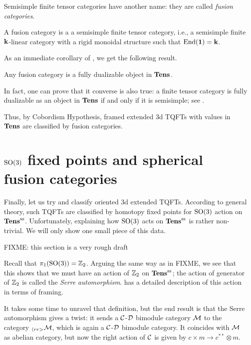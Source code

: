 Semisimple finite tensor categories have another name: they are called
\emph{fusion categories}.


\begin{definition}\label{d:fusion}
  A fusion category is a a semisimple finite tensor category, i.e., a semisimple
  finite $\mathbf{k}$-linear category with a rigid monoidal structure such that
  $\operatorname{End}(\mathbf{1})=\mathbf{k}$.
\end{definition}

As an immediate corollary of , we get the
following result.
\begin{corollary}\label{c:fusion-fd}
  Any fusion category is a fully dualizable object in $\mathbf{Tens}$.
\end{corollary}

In fact, one can prove that it converse is also true: a finite tensor
category is fully dualizable as an object in $\mathbf{Tens}$ if and only if it is
semisimple; see \cite[Proposition 3.4.10]{dsps-dualizable}.

Thus, by Cobordism Hypothesis, framed extended 3d TQFTs with values in $\mathbf{Tens}$
are classified by fusion categories.


\section{$\mathrm{SO}(3)$ fixed points and spherical
    fusion categories}\label{s:spherical1}

Finally, let us try and classify oriented 3d extended TQFTs. According to
general theory, such TQFTs are classified by homotopy fixed points for $\mathrm{SO}(3)$
action on $\mathbf{Tens}^{\mathrm{ss}}$. Unfortunately, explaining how $\mathrm{SO}(3)$ acts on
$\mathbf{Tens}^{\mathrm{ss}}$ is rather non-trivial. We will only show one small piece of this
data.

FIXME: this section is a very rough draft

Recall that $\pi_1(\mathrm{SO}(3))=\mathbb{Z}_2$. Arguing the same way as in FIXME, we see that
this shows that we must have an action of $\mathbb{Z}_2$ on $\mathbf{Tens}^{\mathrm{ss}}$; the action of
generator of $\mathbb{Z}_2$ is called the \emph{Serre automorphism}.
\cite{dsps-dualizable} has a detailed description of this action in terms of
framing.

It takes some time to unravel that definition, but the end result is that the
Serre automorphism gives a twist: it sends a $\mathcal{C}$-$\mathcal{D}$ bimodule category
$\mathcal{M}$ to the category ${}_{\langle rr>}\mathcal{M}$, which is again a $\mathcal{C}$-$\mathcal{D}$
bimodule category. It coincides with $\mathcal{M}$ as abelian category, but now the
right action of $\mathcal{C}$ is given by $c\times m\to c^{**}\otimes m$.

